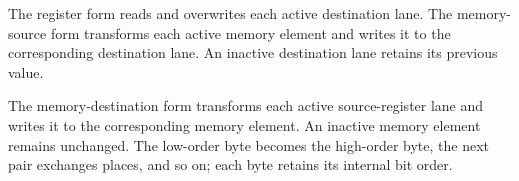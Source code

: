 The register form reads and overwrites each active destination lane. The
memory-source form transforms each active memory element and writes it to the
corresponding destination lane. An inactive destination lane retains its
previous value.

The memory-destination form transforms each active source-register lane and
writes it to the corresponding memory element. An inactive memory element
remains unchanged. The low-order byte becomes the high-order byte, the next
pair exchanges places, and so on; each byte retains its internal bit order.
